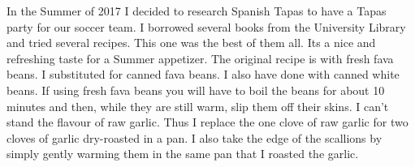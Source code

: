 \documentclass[11pt,letterpaper]{article}
\begin{document}


In the Summer of 2017 I decided to research Spanish Tapas to have a Tapas party for our soccer team. I borrowed several books from the University Library and tried several recipes. This one was the best of them all. Its a nice and refreshing taste for a Summer appetizer. The original recipe is with fresh fava beans. I substituted for canned fava beans. I also have done with canned white beans. If using fresh fava beans you will have to boil the beans for about 10 minutes and then, while they are still warm, slip them off their skins. I can't stand the flavour of raw garlic. Thus I replace the one clove of raw garlic for two cloves of garlic dry-roasted in a pan. I also take the edge of the scallions by simply gently warming them in the same pan that I roasted the garlic.
 
\end{document}
